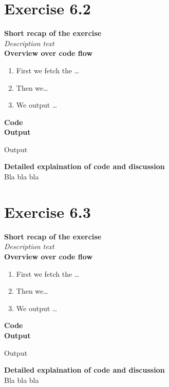 \documentclass{article}
\newcommand\pythonstyle{\lstset{
language=python,
breaklines=true,
basicstyle=\ttfamily\small,
otherkeywords={1, 2, 3, 4, 5, 6, 7, 8 ,9 , 0, -, =, +, [, ], (, ), \{, \}, :, *, !},             %
keywordstyle=\color{blue},
emph={class, pass, in, for, while, if, is, elif, else, not, and, or, OR
    def, print, exec, break, continue, return},
emphstyle=\color{black}\bfseries,
emph={[2]True, False, None, self},
emphstyle=[2]\color{purple},
emph={[3]from, import, as},
emphstyle=[3]\color{blue},
stringstyle=\color{red},
frame=tb,
showstringspaces=false,
morecomment=[s]{"""}{"""},
commentstyle=\color{gray},
rulesepcolor=\color{blue},
title=\lstname
}}
\newcommand\pythonexternal[2][]{{
\pythonstyle
}}
\begin{document}
\section{Exercise 6.2}
\textbf{Short recap of the exercise}\\
\textit{Description text}\\

\textbf{Overview over code flow}\\

\begin{enumerate}
  \item First we fetch the \ldots
  \item Then we\ldots
  \item We output \ldots\\
\end{enumerate}

\textbf{Code}\\
\textbf{Output}
\begin{pythonOutput}
Output
\end{pythonOutput}
\textbf{Detailed explaination of code and discussion}\\
Bla bla bla

\section{Exercise 6.3}
\textbf{Short recap of the exercise}\\
\textit{Description text}\\

\textbf{Overview over code flow}\\

\begin{enumerate}
  \item First we fetch the \ldots
  \item Then we\ldots
  \item We output \ldots\\
\end{enumerate}

\textbf{Code}\\
\textbf{Output}
\begin{pythonOutput}
Output
\end{pythonOutput}
\textbf{Detailed explaination of code and discussion}\\
Bla bla bla
\end{document}
